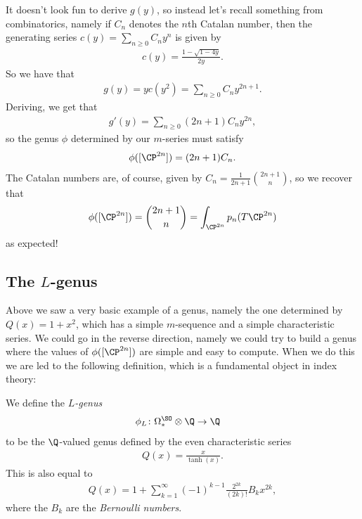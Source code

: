 \documentclass[11pt]{book}
\begin{document}
\begin{example}
It doesn't look fun to derive $g(y)$, so instead let's recall something from combinatorics, namely if $C_n$ denotes the $n$th Catalan number, then the generating series $c(y) = \sum_{n\ge0} C_n y^n$ is given by
\begin{align*}
    c(y) = \frac{1 - \sqrt{1-4y}}{2y}.
\end{align*}
So we have that
\begin{align*}
    g(y) = y c(y^2) = \sum_{n\ge0} C_n y^{2n+1}.
\end{align*}
Deriving, we get that
\begin{align*}
    g'(y) = \sum_{n\ge0} (2n+1) C_n y^{2n},
\end{align*}
so the genus $\phi$ determined by our $m$-series must satisfy
\begin{align*}
    \phi([\CP^{2n}]) = (2n+1)C_n.
\end{align*}
The Catalan numbers are, of course, given by $C_n = \frac{1}{2n+1} \binom{2n+1}{n}$, so we recover that
\begin{align*}
    \phi([\CP^{2n}]) = \binom{2n+1}{n} = \int_{\CP^{2n}}p_n(T\CP^{2n})
\end{align*}
as expected!
\end{example}

\subsection{The $L$-genus}

Above we saw a very basic example of a genus, namely the one determined by $Q(x) = 1+x^2$, which has a simple $m$-sequence and a simple characteristic series. We could go in the reverse direction, namely we could try to build a genus where the values of $\phi([\CP^{2n}])$ are simple and easy to compute. When we do this we are led to the following definition, which is a fundamental object in index theory:

\begin{definition}\label{def:L-genus} We define the \emph{$L$-genus}
\begin{align*}
    \phi_L \colon \Omega^{\SO}_\ast \otimes \Q &\to \Q
\end{align*}
to be the $\Q$-valued genus defined by the even characteristic series
\begin{align*}
    Q(x) = \frac{x}{\tanh(x)}.
\end{align*}
This is also equal to
\begin{align*}
    Q(x) =1 + \sum_{k=1}^\infty (-1)^{k-1} \frac{2^{2k}}{(2k)!}B_k x^{2k},
\end{align*}
where the $B_k$ are the \emph{Bernoulli numbers}.
\end{definition}
\end{document}
